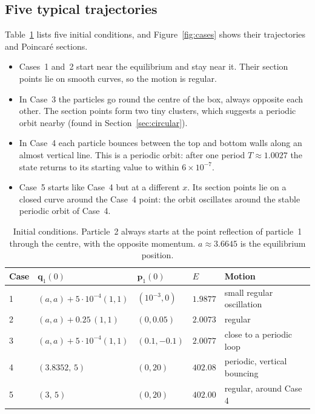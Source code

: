 \documentclass[11pt,a4paper]{article}
\newcommand{\q}{\mathbf{q}}
\newcommand{\p}{\mathbf{p}}
\begin{document}
\subsection{Five typical trajectories}\label{sec:trajectories}
Table~\ref{tab:cases} lists five initial conditions, and
Figure~\ref{fig:cases} shows their trajectories and Poincar\'e sections.
\begin{itemize}
  \item Cases~1 and~2 start near the equilibrium and stay near it. Their
        section points lie on smooth curves, so the motion is regular.
  \item In Case~3 the particles go round the centre of the box, always
        opposite each other. The section points form two tiny clusters, which
        suggests a periodic orbit nearby (found in Section~\ref{sec:circular}).
  \item In Case~4 each particle bounces between the top and bottom walls along
        an almost vertical line. This is a periodic orbit: after one period
        $T\approx1.0027$ the state returns to its starting value to within
        $6\times10^{-7}$.
  \item Case~5 starts like Case~4 but at a different $x$. Its section points
        lie on a closed curve around the Case~4 point: the orbit oscillates
        around the stable periodic orbit of Case~4.
\end{itemize}

\begin{table}[H]
\centering
\caption{Initial conditions. Particle~2 always starts at the point reflection
of particle~1 through the centre, with the opposite momentum. $a\approx3.6645$
is the equilibrium position.}
\label{tab:cases}
\begin{tabular}{@{}lllll@{}}
\toprule
Case & $\q_1(0)$ & $\p_1(0)$ & $E$ & Motion\\
\midrule
1 & $(a,a)+5\cdot10^{-4}(1,1)$ & $(10^{-3},0)$ & $1.9877$ & small regular oscillation\\
2 & $(a,a)+0.25\,(1,1)$ & $(0,0.05)$ & $2.0073$ & regular\\
3 & $(a,a)+5\cdot10^{-4}(1,1)$ & $(0.1,-0.1)$ & $2.0077$ & close to a periodic loop\\
4 & $(3.8352,\,5)$ & $(0,20)$ & $402.08$ & periodic, vertical bouncing\\
5 & $(3,\,5)$ & $(0,20)$ & $402.00$ & regular, around Case 4\\
\bottomrule
\end{tabular}
\end{table}
\end{document}
